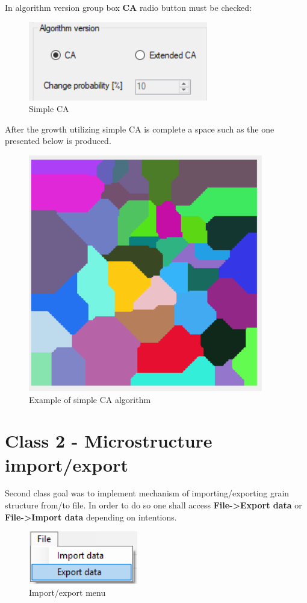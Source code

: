 \documentclass[a4paper, 11pt]{article}
\begin{document}
In algorithm version group box \textbf{CA} radio button must be checked:
\begin{figure}[H]
\centering
  \includegraphics{SimpleCAGroupBox}
  \caption{Simple CA}
  \label{fig:boat1}
\end{figure}

After the growth utilizing simple CA is complete a space such as the one presented below is produced.
\begin{figure}[H]
\centering
  \includegraphics[]{SimpleCAExample}
  \caption{Example of simple CA algorithm}
  \label{fig:boat1}
\end{figure}


\section*{Class 2 - Microstructure import/export}
Second class goal was to implement mechanism of importing/exporting grain structure from/to file. In order to do so one shall access \textbf{File->Export data} or \textbf{File->Import data} depending on intentions.
\begin{figure}[H]
\centering
  \includegraphics{File}
  \caption{Import/export menu}
  \label{fig:boat1}
\end{figure}
\end{document}
